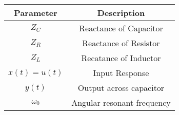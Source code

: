 \begin{tabular}{|c|c|}
\hline
    \textbf{Parameter} & \textbf{Description}  \\
    \hline
    $Z_C$ & Reactance of Capacitor \\
    \hline
    $Z_R$ & Reactance of Resistor \\
    \hline
    $Z_L$ & Recatance of Inductor \\
    \hline
    $x(t) = u(t)$ & Input Response \\
    \hline
    $y(t)$ & Output across capacitor \\
    \hline
    $\omega_0$ & Angular resonant frequency \\
    \hline
    \end{tabular}
